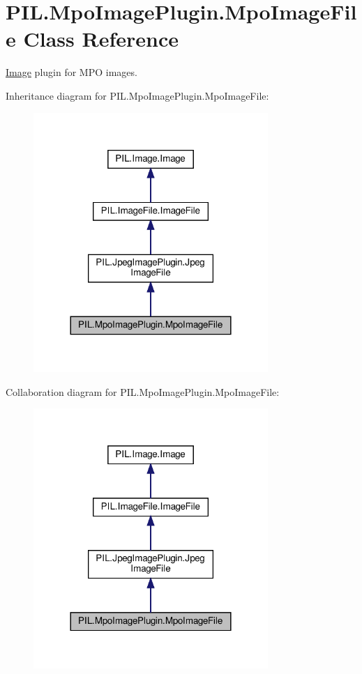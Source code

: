 \hypertarget{classPIL_1_1MpoImagePlugin_1_1MpoImageFile}{}\section{P\+I\+L.\+Mpo\+Image\+Plugin.\+Mpo\+Image\+File Class Reference}
\label{classPIL_1_1MpoImagePlugin_1_1MpoImageFile}


\hyperlink{namespacePIL_1_1Image}{Image} plugin for M\+PO images.  




Inheritance diagram for P\+I\+L.\+Mpo\+Image\+Plugin.\+Mpo\+Image\+File\+:
\nopagebreak
\begin{figure}[H]
\begin{center}
\leavevmode
\includegraphics[width=252pt]{classPIL_1_1MpoImagePlugin_1_1MpoImageFile__inherit__graph}
\end{center}
\end{figure}


Collaboration diagram for P\+I\+L.\+Mpo\+Image\+Plugin.\+Mpo\+Image\+File\+:
\nopagebreak
\begin{figure}[H]
\begin{center}
\leavevmode
\includegraphics[width=252pt]{classPIL_1_1MpoImagePlugin_1_1MpoImageFile__coll__graph}
\end{center}
\end{figure}
